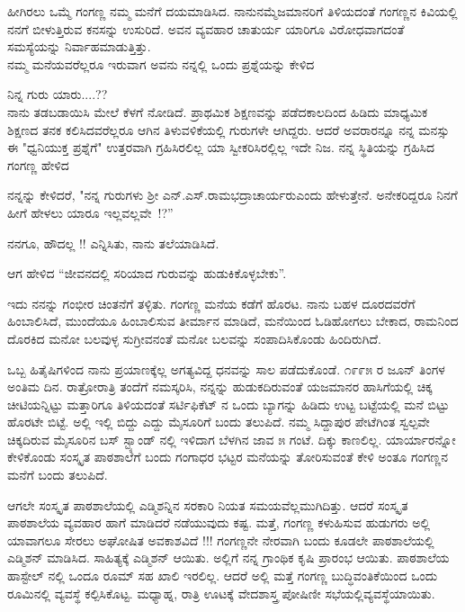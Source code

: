{ಹೀಗಿರಲು ಒಮ್ಮೆ ಗಂಗಣ್ಣ ನಮ್ಮ ಮನೆಗೆ ದಯಮಾಡಿಸಿದ. ನಾನು\break ನಮ್ಮೆಜಮಾನರಿಗೆ ತಿಳಿಯದಂತೆ ಗಂಗಣ್ಣನ ಕಿವಿಯಲ್ಲಿ ನನಗೆ ಬೀಳುತ್ತಿರುವ ಕನಸನ್ನು ಉಸುರಿದೆ. ಅವನ ವ್ಯವಹಾರ ಚಾತುರ್ಯ ಯಾರಿಗೂ ವಿರೋಧವಾಗದಂತೆ ಸಮಸ್ಯೆಯನ್ನು ನಿರ್ವಾಹಮಾಡುತ್ತಿತ್ತು.\\ 
ನಮ್ಮ ಮನೆಯವರೆಲ್ಲರೂ ಇರುವಾಗ ಅವನು ನನ್ನಲ್ಲಿ ಒಂದು ಪ್ರಶ್ನೆಯನ್ನು ಕೇಳಿದ\enginline{-} 

ನಿನ್ನ ಗುರು ಯಾರು....??\\
ನಾನು ತಡಬಡಾಯಿಸಿ ಮೇಲೆ ಕೆಳಗೆ ನೋಡಿದೆ. ಪ್ರಾಥಮಿಕ ಶಿಕ್ಷಣವನ್ನು ಪಡೆದ\break ಕಾಲದಿಂದ ಹಿಡಿದು ಮಾಧ್ಯಮಿಕ ಶಿಕ್ಷಣದ ತನಕ \hbox{ಕಲಿಸಿದವರೆಲ್ಲರೂ} ಆಗಿನ ತಿಳುವಳಿಕೆಯಲ್ಲಿ ಗುರುಗಳೇ ಆಗಿದ್ದರು. ಆದರೆ ಅವರಾರನ್ನೂ ನನ್ನ ಮನಸ್ಸು ಈ "ಧ್ವನಿಯುಕ್ತ ಪ್ರಶ್ನೆಗೆ" ಉತ್ತರವಾಗಿ ಗ್ರಹಿಸಿರಲಿಲ್ಲ ಯಾ ಸ್ವೀಕರಿಸಿರಲ್ಲಿಲ್ಲ \enginline{-} ಇದೇ ನಿಜ. ನನ್ನ ಸ್ಥಿತಿಯನ್ನು  ಗ್ರಹಿಸಿದ ಗಂಗಣ್ಣ ಹೇಳಿದ \enginline{-} 

ನನ್ನನ್ನು ಕೇಳಿದರೆ, "ನನ್ನ ಗುರುಗಳು ಶ್ರೀ ಎನ್.ಎಸ್.ರಾಮಭದ್ರಾಚಾರ್ಯರು\break ಎಂದು ಹೇಳುತ್ತೇನೆ. ಅನೇಕರಿದ್ದರೂ ನಿನಗೆ ಹೀಗೆ ಹೇಳಲು ಯಾರೂ ಇಲ್ಲವಲ್ಲವೇ~!?”  

ನನಗೂ, ಹೌದಲ್ಲ !! ಎನ್ನಿಸಿತು, ನಾನು ತಲೆಯಾಡಿಸಿದೆ. 

ಆಗ ಹೇಳಿದ \enginline{-}  “ಜೀವನದಲ್ಲಿ ಸರಿಯಾದ ಗುರುವನ್ನು ಹುಡುಕಿಕೊಳ್ಳಬೇಕು”. 

ಇದು ನನನ್ನು ಗಂಭೀರ ಚಿಂತನೆಗೆ ತಳ್ಳಿತು. 
ಗಂಗಣ್ಣ ಮನೆಯ ಕಡೆಗೆ ಹೊರಟ. ನಾನು ಬಹಳ ದೂರದವರೆಗೆ ಹಿಂಬಾಲಿಸಿದೆ, ಮುಂದೆಯೂ ಹಿಂಬಾಲಿಸುವ ತೀರ್ಮಾನ ಮಾಡಿದೆ, ಮನೆಯಿಂದ ಓಡಿಹೋಗಲು ಬೇಕಾದ, ರಾಮನಿಂದ ದೊರಕಿದ ಮನೋ\- ಬಲವುಳ್ಳ ಸುಗ್ರೀವನಂತೆ ಮನೋ ಬಲವನ್ನು ಸಂಪಾದಿಸಿಕೊಂಡು  ಹಿಂದಿರುಗಿದೆ. 

ಒಬ್ಬ ಹಿತೈಷಿಗಳಿಂದ ನಾನು ಪ್ರಯಾಣಕ್ಕೆಲ್ಲ ಅಗತ್ಯವಿದ್ದ ಧನವನ್ನು ಸಾಲ ಪಡೆದುಕೊಂಡೆ. ೧೯೯೫ ರ ಜೂನ್ ತಿಂಗಳ ಅಂತಿಮ ದಿನ. ರಾತ್ರೋರಾತ್ರಿ ತಂದೆಗೆ ನಮಸ್ಕರಿಸಿ, ನನ್ನನ್ನು ಹುಡುಕದಿರುವಂತೆ ಯಜಮಾನರ ಹಾಸಿಗೆಯಲ್ಲಿ ಚಿಕ್ಕ ಚೀಟಿಯನ್ನಿಟ್ಟು ಮತ್ತಾರಿಗೂ ತಿಳಿಯದಂತೆ ಸರ್ಟಿಫಿಕೆಟ್ ನ ಒಂದು ಬ್ಯಾಗನ್ನು ಹಿಡಿದು ಉಟ್ಟ ಬಟ್ಟೆಯಲ್ಲಿ ಮನೆ ಬಿಟ್ಟು  ಹೊರಟೇ ಬಿಟ್ಟೆ. ಅಲ್ಲಿ ಇಲ್ಲಿ ಬಿದ್ದು ಎದ್ದು ಮೈಸೂರಿಗೆ ಬಂದು ತಲುಪಿದೆ. ನಮ್ಮ ಸಿದ್ದಾಪುರ ಪೇಟೆಗಿಂತ ಸ್ವಲ್ಪವೇ ಚಿಕ್ಕದಿರುವ ಮೈಸೂರಿನ ಬಸ್ ಸ್ಟ್ಯಾಂಡ್ ನಲ್ಲಿ ಇಳಿದಾಗ ಬೆಳಗಿನ ಜಾವ ೫ ಗಂಟೆ. ದಿಕ್ಕು ಕಾಣಲಿಲ್ಲ. ಯಾರ್ಯಾರನ್ನೋ ಕೇಳಿಕೊಂಡು ಸಂಸ್ಕೃತ ಪಾಠಶಾಲೆಗೆ ಬಂದು ಗಂಗಾಧರ ಭಟ್ಟರ ಮನೆಯನ್ನು ತೋರಿಸುವಂತೆ ಕೇಳಿ ಅಂತೂ ಗಂಗಣ್ಣನ ಮನೆಗೆ ಬಂದು ತಲುಪಿದೆ. 

ಆಗಲೇ ಸಂಸ್ಕೃತ ಪಾಠಶಾಲೆಯಲ್ಲಿ ಎಡ್ಮಿಶನ್ನಿನ ಸರಕಾರಿ ನಿಯತ ಸಮಯವೆಲ್ಲ\break ಮುಗಿದಿತ್ತು. ಆದರೆ ಸಂಸ್ಕೃತ ಪಾಠಶಾಲೆಯ ವ್ಯವಹಾರ ಹಾಗೆ ಮಾಡಿದರೆ ನಡೆಯು\-ವುದು ಕಷ್ಟ. ಮತ್ತೆ, ಗಂಗಣ್ಣ ಕಳುಹಿಸುವ ಹುಡುಗರು ಅಲ್ಲಿ ಯಾವಾಗಲೂ ಸೇರಲು ಅಘೋಷಿತ ಅವಕಾಶವಿದೆ !!! ಗಂಗಣ್ಣನೇ ನೇರವಾಗಿ ಬಂದು ಕೂಡಲೇ ಪಾಠಶಾಲೆಯಲ್ಲಿ ಎಡ್ಮಿಶನ್ ಮಾಡಿಸಿದ. ಸಾಹಿತ್ಯಕ್ಕೆ ಎಡ್ಮಿಶನ್ ಆಯಿತು. ಅಲ್ಲಿಗೆ ನನ್ನ ಗ್ರಾಂಥಿಕ ಕೃಷಿ ಪ್ರಾರಂಭ ಆಯಿತು. ಪಾಠಶಾಲೆಯ ಹಾಸ್ಟೇಲ್ ನಲ್ಲಿ ಒಂದೂ ರೂಮ್ ಸಹ ಖಾಲಿ ಇರಲಿಲ್ಲ. ಆದರೆ ಅಲ್ಲಿ ಮತ್ತೆ ಗಂಗಣ್ಣ  ಬುದ್ಧಿವಂತಿಕೆಯಿಂದ ಒಂದು ರೂಮಿನಲ್ಲಿ ವ್ಯವಸ್ಥೆ ಕಲ್ಪಿಸಿ\-ಕೊಟ್ಟ. ಮಧ್ಯಾಹ್ನ, ರಾತ್ರಿ ಊಟಕ್ಕೆ ವೇದಶಾಸ್ತ್ರ ಪೋಷಿಣೀ ಸಭೆಯಲ್ಲಿ\break ವ್ಯವಸ್ಥೆಯಾಯಿತು.


}
